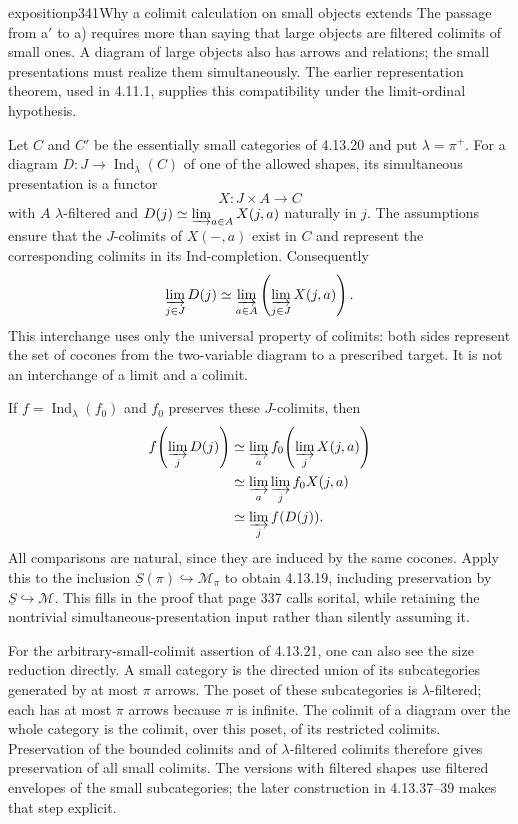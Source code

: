 \begin{dcomment}{exposition}{p341}{Why a colimit calculation on small objects extends}
The passage from a$'$ to a) requires more than saying that large objects are filtered colimits of small ones. A diagram of large objects also has arrows and relations; the small presentations must realize them simultaneously. The earlier representation theorem, used in 4.11.1, supplies this compatibility under the limit-ordinal hypothesis.

Let $C$ and $C'$ be the essentially small categories of 4.13.20 and put $\lambda=\pi^+$. For a diagram $D:J\to\operatorname{Ind}_\lambda(C)$ of one of the allowed shapes, its simultaneous presentation is a functor
\[
                       X:J\times A\longrightarrow C
\]
with $A$ $\lambda$-filtered and $D(j)\simeq\varinjlim_{a\in A}X(j,a)$ naturally in $j$. The assumptions ensure that the $J$-colimits of $X(-,a)$ exist in $C$ and represent the corresponding colimits in its Ind-completion. Consequently
\[
\varinjlim_{j\in J}D(j)
 \simeq
\varinjlim_{a\in A}\left(\varinjlim_{j\in J}X(j,a)\right).
\]
This interchange uses only the universal property of colimits: both sides represent the set of cocones from the two-variable diagram to a prescribed target. It is not an interchange of a limit and a colimit.

If $f=\operatorname{Ind}_\lambda(f_0)$ and $f_0$ preserves these $J$-colimits, then
\[
\begin{aligned}
f\!\left(\varinjlim_jD(j)\right)
 &\simeq\varinjlim_a f_0\!\left(\varinjlim_jX(j,a)\right)\\
 &\simeq\varinjlim_a\varinjlim_jf_0X(j,a)\\
 &\simeq\varinjlim_j f(D(j)).
\end{aligned}
\]
All comparisons are natural, since they are induced by the same cocones. Apply this to the inclusion $\underline S(\pi)\hookrightarrow\mathcal M_\pi$ to obtain 4.13.19, including preservation by $\underline S\hookrightarrow\mathcal M$. This fills in the proof that page 337 calls sorital, while retaining the nontrivial simultaneous-presentation input rather than silently assuming it.

For the arbitrary-small-colimit assertion of 4.13.21, one can also see the size reduction directly. A small category is the directed union of its subcategories generated by at most $\pi$ arrows. The poset of these subcategories is $\lambda$-filtered; each has at most $\pi$ arrows because $\pi$ is infinite. The colimit of a diagram over the whole category is the colimit, over this poset, of its restricted colimits. Preservation of the bounded colimits and of $\lambda$-filtered colimits therefore gives preservation of all small colimits. The versions with filtered shapes use filtered envelopes of the small subcategories; the later construction in 4.13.37--39 makes that step explicit.


\end{dcomment}
